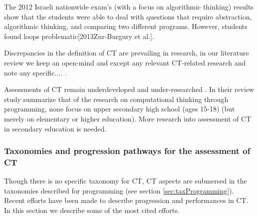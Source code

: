 The 2012 Israeli nationwide exam's (with a focus on algorithmic thinking) results show that the students were able to deal with questions that require abstraction, algorithmic thinking, and comparing two different programs. However, students found loops problematic[2013Zur-Burgury et al.].

Discrepancies in the definition of CT are prevailing in research, in our literature review we keep an open-mind and except any relevant CT-related research and note any specific.... .


Assessments of CT remain underdeveloped and under-researched \cite{Yadav2015}. In their review study  summarize that of the research on computational thinking through programming, none focus on upper secondary high school (ages 15-18) (but merely on elementary or higher education). More research into assessment of CT in secondary education is needed.




\subsubsection{Taxonomies and progression pathways for the assessment of CT}
Though there is no specific taxonomy for CT, CT aspects are submersed in the taxonomies described for programming (see section \ref{sec:taxProgramming}). Recent efforts have been made to describe progression and performances in CT. In this section we describe some of the most cited efforts.

